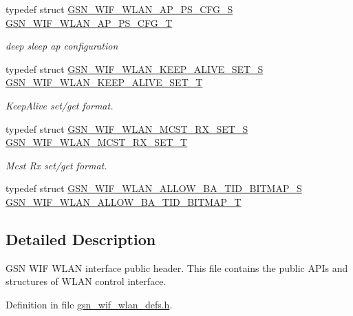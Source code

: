 \begin{DoxyCompactItemize}
\item 
typedef struct \hyperlink{a00368}{GSN\_\-WIF\_\-WLAN\_\-AP\_\-PS\_\-CFG\_\-S} \hyperlink{a00677_ga5b778f6fbad2d264cc6e8d03a61b7a42}{GSN\_\-WIF\_\-WLAN\_\-AP\_\-PS\_\-CFG\_\-T}
\begin{DoxyCompactList}\small\item\em deep sleep ap configuration \end{DoxyCompactList}\item 
typedef struct \hyperlink{a00385}{GSN\_\-WIF\_\-WLAN\_\-KEEP\_\-ALIVE\_\-SET\_\-S} \hyperlink{a00677_ga05b94921534c912004364babe9d0c9e9}{GSN\_\-WIF\_\-WLAN\_\-KEEP\_\-ALIVE\_\-SET\_\-T}
\begin{DoxyCompactList}\small\item\em KeepAlive set/get format. \end{DoxyCompactList}\item 
typedef struct \hyperlink{a00389}{GSN\_\-WIF\_\-WLAN\_\-MCST\_\-RX\_\-SET\_\-S} \hyperlink{a00677_ga1c35c53aa2b78b1856a8fe1233b8368e}{GSN\_\-WIF\_\-WLAN\_\-MCST\_\-RX\_\-SET\_\-T}
\begin{DoxyCompactList}\small\item\em Mcst Rx set/get format. \end{DoxyCompactList}\item 
typedef struct \hyperlink{a00365}{GSN\_\-WIF\_\-WLAN\_\-ALLOW\_\-BA\_\-TID\_\-BITMAP\_\-S} \hyperlink{a00677_gafb05388636305e014ec95505951eca42}{GSN\_\-WIF\_\-WLAN\_\-ALLOW\_\-BA\_\-TID\_\-BITMAP\_\-T}
\end{DoxyCompactItemize}


\subsection{Detailed Description}
GSN WIF WLAN interface public header. This file contains the public APIs and structures of WLAN control interface. 

Definition in file \hyperlink{a00613_source}{gsn\_\-wif\_\-wlan\_\-defs.h}.



